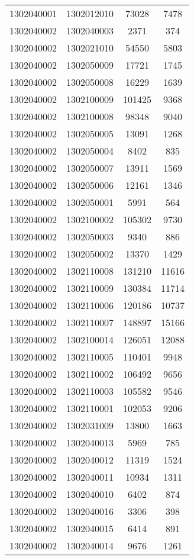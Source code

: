 \begin{longtable}[h]{llcc}
		1302040001 & 1302012010 & 73028 & 7478\\
		1302040002 & 1302040003 & 2371 & 374\\
		1302040002 & 1302021010 & 54550 & 5803\\
		1302040002 & 1302050009 & 17721 & 1745\\
		1302040002 & 1302050008 & 16229 & 1639\\
		1302040002 & 1302100009 & 101425 & 9368\\
		1302040002 & 1302100008 & 98348 & 9040\\
		1302040002 & 1302050005 & 13091 & 1268\\
		1302040002 & 1302050004 & 8402 & 835\\
		1302040002 & 1302050007 & 13911 & 1569\\
		1302040002 & 1302050006 & 12161 & 1346\\
		1302040002 & 1302050001 & 5991 & 564\\
		1302040002 & 1302100002 & 105302 & 9730\\
		1302040002 & 1302050003 & 9340 & 886\\
		1302040002 & 1302050002 & 13370 & 1429\\
		1302040002 & 1302110008 & 131210 & 11616\\
		1302040002 & 1302110009 & 130384 & 11714\\
		1302040002 & 1302110006 & 120186 & 10737\\
		1302040002 & 1302110007 & 148897 & 15166\\
		1302040002 & 1302100014 & 126051 & 12088\\
		1302040002 & 1302110005 & 110401 & 9948\\
		1302040002 & 1302110002 & 106492 & 9656\\
		1302040002 & 1302110003 & 105582 & 9546\\
		1302040002 & 1302110001 & 102053 & 9206\\
		1302040002 & 1302031009 & 13800 & 1663\\
		1302040002 & 1302040013 & 5969 & 785\\
		1302040002 & 1302040012 & 11319 & 1524\\
		1302040002 & 1302040011 & 10934 & 1311\\
		1302040002 & 1302040010 & 6402 & 874\\
		1302040002 & 1302040016 & 3306 & 398\\
		1302040002 & 1302040015 & 6414 & 891\\
		1302040002 & 1302040014 & 9676 & 1261\\

\end{longtable}

